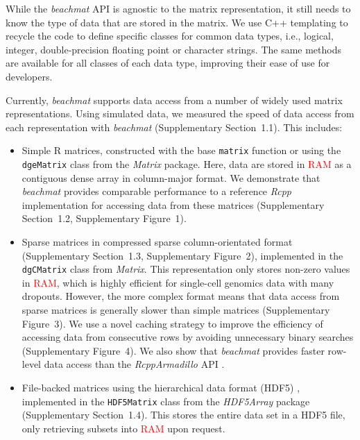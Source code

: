 \documentclass[10pt,letterpaper]{article}
\newcommand{\suppfigsimpleaccess}{1}
\newcommand{\suppfigsparseschem}{2}
\newcommand{\suppfigsparsecol}{3}
\newcommand{\suppfigsparserow}{4}
\newcommand{\suppsecsimdesign}{1.1}
\newcommand{\suppsecsimple}{1.2}
\newcommand{\suppsecsparse}{1.3}
\newcommand{\suppsechdfmat}{1.4}
\newcommand{\beachmat}{\textit{beachmat}}
\newcommand{\revised}[1]{\textcolor{red}{#1}}
\begin{document}
While the \beachmat{} API is agnostic to the matrix representation, it still needs to know the type of data that are stored in the matrix.
We use C++ templating to recycle the code to define specific classes for common data types, i.e., logical, integer, double-precision floating point or character strings.
The same methods are available for all classes of each data type, improving their ease of use for developers.

Currently, \beachmat{} supports data access from a number of widely used matrix representations.
Using simulated data, we measured the speed of data access from each representation with \beachmat{} (Supplementary Section~\suppsecsimdesign{}).
This includes:
\begin{itemize}
    \item Simple R matrices, constructed with the base \texttt{matrix} function or using the \texttt{dgeMatrix} class from the \textit{Matrix} package.
        Here, data are stored in \revised{RAM} as a contiguous dense array in column-major format.
        We demonstrate that \beachmat{} provides comparable performance to a reference \textit{Rcpp} implementation for accessing data from these matrices 
        (Supplementary Section~\suppsecsimple{}, Supplementary Figure~\suppfigsimpleaccess{}). 
    \item Sparse matrices in compressed sparse column-orientated format (Supplementary Section~\suppsecsparse{}, Supplementary Figure~\suppfigsparseschem{}), 
        implemented in the \texttt{dgCMatrix} class from \textit{Matrix}.
        This representation only stores non-zero values in \revised{RAM}, which is highly efficient for single-cell genomics data with many dropouts.
        However, the more complex format means that data access from sparse matrices is generally slower than simple matrices (Supplementary Figure~\suppfigsparsecol{}).
        We use a novel caching strategy to improve the efficiency of accessing data from consecutive rows by avoiding unnecessary binary searches (Supplementary Figure~\suppfigsparserow{}).
        We also show that \beachmat{} provides faster row-level data access than the \textit{RcppArmadillo} API \cite{eddelbuettel2014arma}.
    \item File-backed matrices using the hierarchical data format (HDF5) \cite{hdf5}, 
        implemented in the \texttt{HDF5Matrix} class from the \textit{HDF5Array} package (Supplementary Section~\suppsechdfmat{}).
        This stores the entire data set in a HDF5 file, only retrieving subsets into \revised{RAM} upon request.

\end{itemize}
\end{document}
